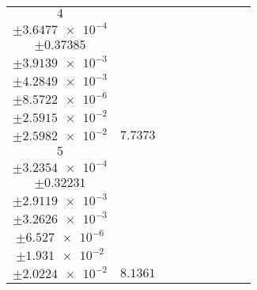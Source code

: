 \documentclass[8pt]{article}
\begin{document}
\begin{longtable}[l]{c c c c c c c c c}
$\num{4}$ & \begin{tabular}[c]{@{}c@{}}$\num{5.5992e-2}$ \\ $\pm\num{3.6477e-4}$\end{tabular} & \begin{tabular}[c]{@{}c@{}}$\num{1.225}$ \\ $\pm\num{0.37385}$\end{tabular} & \begin{tabular}[c]{@{}c@{}}$\num{9.9688}$ \\ $\pm\num{3.9139e-3}$\end{tabular} & \begin{tabular}[c]{@{}c@{}}$\num{2.0412e+3}$ \\ $\pm\num{4.2849e-3}$\end{tabular} & \begin{tabular}[c]{@{}c@{}}$\num{4.0836}$ \\ $\pm\num{8.5722e-6}$\end{tabular} & \begin{tabular}[c]{@{}c@{}}$\num{3.2732}$ \\ $\pm\num{2.5915e-2}$\end{tabular} & \begin{tabular}[c]{@{}c@{}}$\num{3.4268}$ \\ $\pm\num{2.5982e-2}$\end{tabular} & $\num{7.7373}$\\
$\num{5}$ & \begin{tabular}[c]{@{}c@{}}$\num{5.6835e-2}$ \\ $\pm\num{3.2354e-4}$\end{tabular} & \begin{tabular}[c]{@{}c@{}}$\num{-1.0027}$ \\ $\pm\num{0.32231}$\end{tabular} & \begin{tabular}[c]{@{}c@{}}$\num{-10.386}$ \\ $\pm\num{2.9119e-3}$\end{tabular} & \begin{tabular}[c]{@{}c@{}}$\num{2.0641e+3}$ \\ $\pm\num{3.2626e-3}$\end{tabular} & \begin{tabular}[c]{@{}c@{}}$\num{4.1294}$ \\ $\pm\num{6.527e-6}$\end{tabular} & \begin{tabular}[c]{@{}c@{}}$\num{2.8158}$ \\ $\pm\num{1.931e-2}$\end{tabular} & \begin{tabular}[c]{@{}c@{}}$\num{3.0447}$ \\ $\pm\num{2.0224e-2}$\end{tabular} & $\num{8.1361}$\\

\end{longtable}
\end{document}
